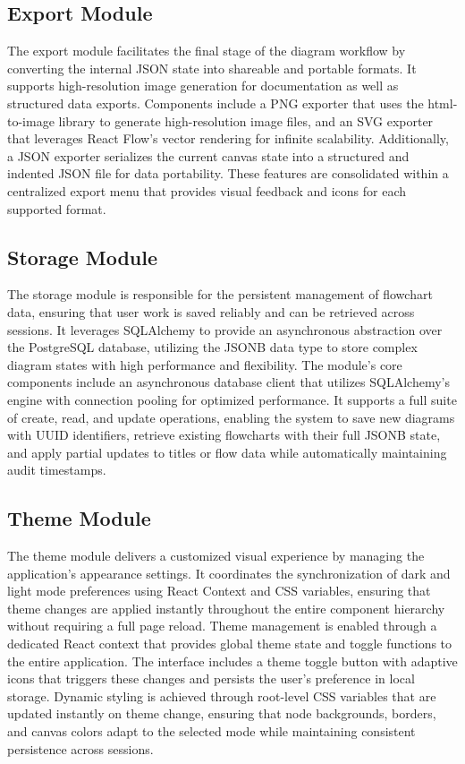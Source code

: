 \subsection{Export Module}

\justifying
The export module facilitates the final stage of the diagram workflow by converting the internal JSON state into shareable and portable formats. It supports high-resolution image generation for documentation as well as structured data exports. Components include a PNG exporter that uses the html-to-image library to generate high-resolution image files, and an SVG exporter that leverages React Flow’s vector rendering for infinite scalability. Additionally, a JSON exporter serializes the current canvas state into a structured and indented JSON file for data portability. These features are consolidated within a centralized export menu that provides visual feedback and icons for each supported format.

\subsection{Storage Module}

\justifying
The storage module is responsible for the persistent management of flowchart data, ensuring that user work is saved reliably and can be retrieved across sessions. It leverages SQLAlchemy to provide an asynchronous abstraction over the PostgreSQL database, utilizing the JSONB data type to store complex diagram states with high performance and flexibility. The module’s core components include an asynchronous database client that utilizes SQLAlchemy’s engine with connection pooling for optimized performance. It supports a full suite of create, read, and update operations, enabling the system to save new diagrams with UUID identifiers, retrieve existing flowcharts with their full JSONB state, and apply partial updates to titles or flow data while automatically maintaining audit timestamps.

\subsection{Theme Module}

\justifying
The theme module delivers a customized visual experience by managing the application's appearance settings. It coordinates the synchronization of dark and light mode preferences using React Context and CSS variables, ensuring that theme changes are applied instantly throughout the entire component hierarchy without requiring a full page reload. Theme management is enabled through a dedicated React context that provides global theme state and toggle functions to the entire application. The interface includes a theme toggle button with adaptive icons that triggers these changes and persists the user’s preference in local storage. Dynamic styling is achieved through root-level CSS variables that are updated instantly on theme change, ensuring that node backgrounds, borders, and canvas colors adapt to the selected mode while maintaining consistent persistence across sessions.

